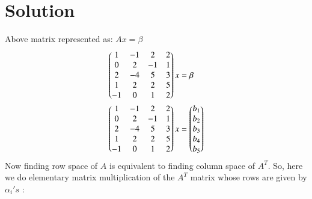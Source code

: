 \documentclass[journal,12pt,twocolumn]{IEEEtran}
\begin{document}
\section{\textbf{Solution}}
Above matrix represented as: $Ax = \beta$
\begin{align}
    \begin{pmatrix}1 & -1 & 2 & 2 \\
                    0 & 2 & -1 & 1 \\
                    2 & -4 & 5 & 3 \\
                    1 & 2 & 2 & 5 \\
                    -1 & 0 & 1 & 2\end{pmatrix}x &= \beta\\
    \begin{pmatrix}1 & -1 & 2 & 2 \\
                    0 & 2 & -1 & 1 \\
                    2 & -4 & 5 & 3 \\
                    1 & 2 & 2 & 5 \\
                    -1 & 0 & 1 & 2\end{pmatrix}x &= 
                    \begin{pmatrix}b_1 \\ b_2 \\ b_3\\ b_4 \\ b_5\end{pmatrix} \label{eq_2}
\end{align}
Now finding row space of $A$ is equivalent to finding column space of $A^T$. So, here we do elementary matrix multiplication of the $A^T$ matrix whose rows are given by $\alpha_i's$ :
\end{document}
